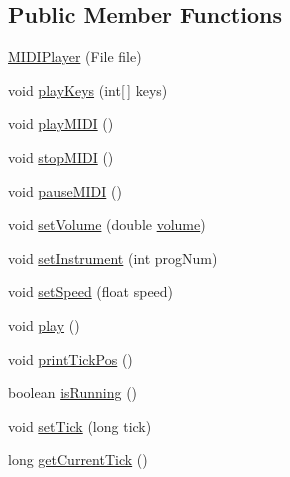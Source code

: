 \subsection*{Public Member Functions}
\begin{DoxyCompactItemize}
\item 
\hyperlink{classcom_1_1lclion_1_1midiplayer_1_1_m_i_d_i_player_a0e4d3ba471e75a0430fbe278fcaa2888}{M\+I\+D\+I\+Player} (File file)
\item 
void \hyperlink{classcom_1_1lclion_1_1midiplayer_1_1_m_i_d_i_player_a28c694149ed3aa271b8dc56eb0785b96}{play\+Keys} (int\mbox{[}$\,$\mbox{]} keys)
\item 
void \hyperlink{classcom_1_1lclion_1_1midiplayer_1_1_m_i_d_i_player_a0bafa31e350020787d811f3697dceb86}{play\+M\+I\+D\+I} ()
\item 
void \hyperlink{classcom_1_1lclion_1_1midiplayer_1_1_m_i_d_i_player_a43e0304f725fff9064639507536d7203}{stop\+M\+I\+D\+I} ()
\item 
void \hyperlink{classcom_1_1lclion_1_1midiplayer_1_1_m_i_d_i_player_a0d9aa818aac57f70d4d9a27cb08aa68a}{pause\+M\+I\+D\+I} ()
\item 
void \hyperlink{classcom_1_1lclion_1_1midiplayer_1_1_m_i_d_i_player_ab82fe765a6f62ab63ed7f35c2c9b3002}{set\+Volume} (double \hyperlink{classcom_1_1lclion_1_1midiplayer_1_1_m_i_d_i_player_aed48ca0bcd2162fd4fd495873e2631f5}{volume})
\item 
void \hyperlink{classcom_1_1lclion_1_1midiplayer_1_1_m_i_d_i_player_a6f0d774251274a44de6466408b9d0193}{set\+Instrument} (int prog\+Num)
\item 
void \hyperlink{classcom_1_1lclion_1_1midiplayer_1_1_m_i_d_i_player_a5466c67c5ec22359c0702dc4ac8ffb19}{set\+Speed} (float speed)
\item 
void \hyperlink{classcom_1_1lclion_1_1midiplayer_1_1_m_i_d_i_player_a6d58098c6cf63c241ed03bc797256bb1}{play} ()
\item 
void \hyperlink{classcom_1_1lclion_1_1midiplayer_1_1_m_i_d_i_player_a7f758814eb3a4fc62794d0453b2cba42}{print\+Tick\+Pos} ()
\item 
boolean \hyperlink{classcom_1_1lclion_1_1midiplayer_1_1_m_i_d_i_player_a876c0699cfeae70f84fc508a4b05b6c0}{is\+Running} ()
\item 
void \hyperlink{classcom_1_1lclion_1_1midiplayer_1_1_m_i_d_i_player_adf42fe0a3253b9d6fed0dea0aba77cb4}{set\+Tick} (long tick)
\item 
long \hyperlink{classcom_1_1lclion_1_1midiplayer_1_1_m_i_d_i_player_a4e64895a61273ddd850ecdc7e7f1d639}{get\+Current\+Tick} ()

\end{DoxyCompactItemize}
